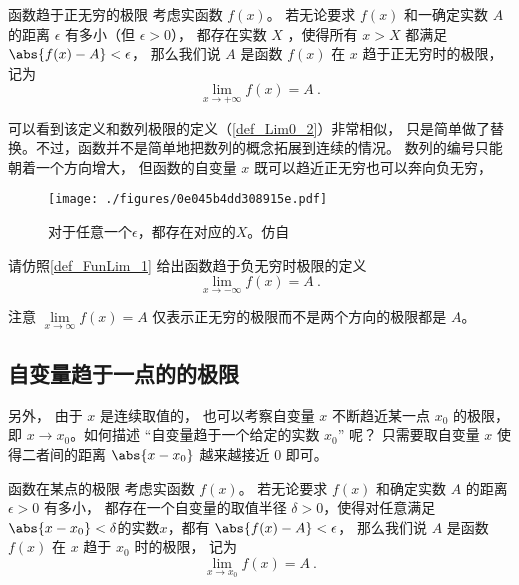 \begin{definition}{函数趋于正无穷的极限}\label{def_FunLim_1}
考虑实函数 $f(x)$。 若无论要求 $f(x)$ 和一确定实数 $A$ 的距离 $\epsilon$ 有多小（但 $\epsilon>0$）， 都存在实数 $X$ ，使得所有 $x>X$ 都满足 $\abs{f(x)-A}<\epsilon$， 那么我们说 $A$ 是函数 $f(x)$ 在 $x$ 趋于正无穷时的极限， 记为
\begin{equation}
\lim\limits_{x\to +\infty} f(x) = A~.
\end{equation}
\end{definition}

可以看到该定义和数列极限的定义（\autoref{def_Lim0_2}）非常相似， 只是简单做了替换。不过，函数并不是简单地把数列的概念拓展到连续的情况。 数列的编号只能朝着一个方向增大， 但函数的自变量 $x$ 既可以趋近正无穷也可以奔向负无穷， 

\begin{figure}[ht]
\centering
\texttt{[image: ./figures/0e045b4dd308915e.pdf]}
\caption{对于任意一个$\epsilon$，都存在对应的$X$。仿自\cite{Thomas}} \label{fig_FunLim_5}
\end{figure}

\begin{exercise}{}
请仿照\autoref{def_FunLim_1} 给出函数趋于负无穷时极限的定义
\begin{equation}
\lim\limits_{x\to -\infty} f(x) = A~.
\end{equation}
\end{exercise}

注意 $\lim\limits_{x\to\infty} f(x) = A$ 仅表示正无穷的极限而不是两个方向的极限都是 $A$。

\subsection{自变量趋于一点的的极限}
另外， 由于 $x$ 是连续取值的， 也可以考察自变量 $x$ 不断趋近某一点 $x_0$ 的极限， 即 $x\to x_0$。如何描述 “自变量趋于一个给定的实数 $x_0$” 呢？ 只需要取自变量 $x$ 使得二者间的距离 $\abs{x-x_0}$ 越来越接近 $0$ 即可。

\begin{definition}{函数在某点的极限}\label{def_FunLim_3}
考虑实函数 $f(x)$。 若无论要求 $f(x)$ 和确定实数 $A$ 的距离 $\epsilon>0$ 有多小， 都存在一个自变量的取值半径 $\delta>0$，使得对任意满足 $\abs{x-x_0} < \delta$的实数$x$，都有 $\abs{f(x)-A}<\epsilon$，
那么我们说 $A$ 是函数 $f(x)$ 在 $x$ 趋于 $x_0$ 时的极限， 记为
\begin{equation}
\lim\limits_{x\to x_0}f(x)=A~.
\end{equation}
\end{definition}

